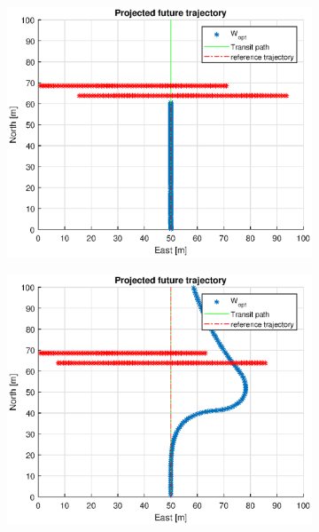 \begin{figure}
\begin{subfigure}[b]{0.499\textwidth}
    \end{subfigure}
    \hfill
    \\
    \begin{subfigure}[b]{0.49\textwidth}
        \centering
        \includegraphics[width=\textwidth]{Images/Figures/Enkel_GW/Simple0_f999_Frame3}
    \end{subfigure}
    \hfill
    \begin{subfigure}[b]{0.499\textwidth}
        \centering
        \includegraphics[width=\textwidth]{Images/Figures/Enkel_GW/Simple0_f999_Frame4}

\end{subfigure}
\end{figure}
